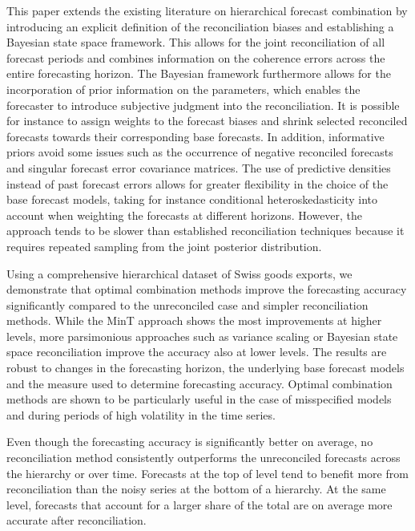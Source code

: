 \documentclass[a4paper,fleqn,11pt]{article}
\begin{document}
This paper extends the existing literature on hierarchical forecast combination by introducing an explicit definition of the reconciliation biases and establishing a Bayesian state space framework. This allows for the joint reconciliation of all forecast periods and combines information on the coherence errors across the entire forecasting horizon. The Bayesian framework furthermore allows for the incorporation of prior information on the parameters, which enables the forecaster to introduce subjective judgment into the reconciliation. It is possible for instance to assign weights to the forecast biases and shrink selected reconciled forecasts towards their corresponding base forecasts. In addition, informative priors avoid some issues such as the occurrence of negative reconciled forecasts and singular forecast error covariance matrices. The use of predictive densities instead of past forecast errors allows for greater flexibility in the choice of the base forecast models, taking for instance conditional heteroskedasticity into account when weighting the forecasts at different horizons. However, the approach tends to be slower than established reconciliation techniques because it requires repeated sampling from the joint posterior distribution.

Using a comprehensive hierarchical dataset of Swiss goods exports, we demonstrate that optimal combination methods improve the forecasting accuracy significantly compared to the unreconciled case and simpler reconciliation methods. While the MinT approach shows the most improvements at higher levels, more parsimonious approaches such as variance scaling or Bayesian state space reconciliation improve the accuracy also at lower levels. The results are robust to changes in the forecasting horizon, the underlying base forecast models and the measure used to determine forecasting accuracy. Optimal combination methods are shown to be particularly useful in the case of misspecified models and during periods of high volatility in the time series.

Even though the forecasting accuracy is significantly better on average, no reconciliation method consistently outperforms the unreconciled forecasts across the hierarchy or over time. Forecasts at the top of level tend to benefit more from reconciliation than the noisy series at the bottom of a hierarchy. At the same level, forecasts that account for a larger share of the total are on average more accurate after reconciliation.


\clearpage


\clearpage


\end{document}
